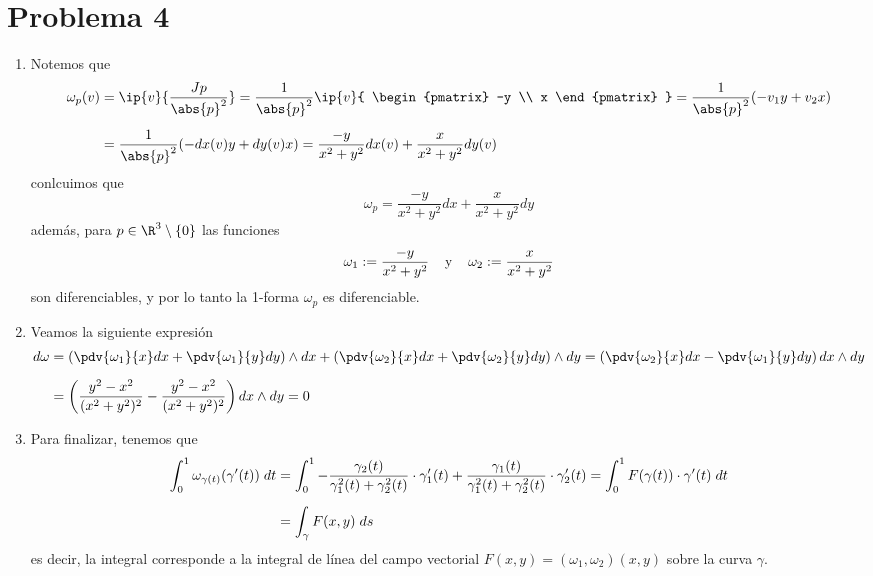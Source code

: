 \documentclass{article}
\begin{document}
\section*{Problema 4}
\begin{enumerate}
    \item Notemos que
    \begin{align*}
        \omega_{p}(v) &= \ip{v}{\frac{Jp}{\abs{p}^{2}}}=\frac{1}{\abs{p}^{2}}\ip{v}{
            \begin{pmatrix}
                -y \\
                x
            \end{pmatrix}
            }=\frac{1}{\abs{p}^{2}}(-v_{1}y+v_{2}x) \\[2mm]
        &= \frac{1}{\abs{p}^{2}}(-dx(v)y+dy(v)x)=\frac{-y}{x^{2}+y^{2}}dx(v)
        +\frac{x}{x^{2}+y^{2}}dy(v)
    \end{align*}
    conlcuimos que
    \begin{equation*}
        \omega_{p}=\frac{-y}{x^{2}+y^{2}}dx+\frac{x}{x^{2}+y^{2}}dy
    \end{equation*}
    además, para $p\in\R^{3}\setminus\{0\}$ las funciones
    \begin{equation*}
        \omega_{1}:=\frac{-y}{x^{2}+y^{2}}\hspace{4mm}\text{y}
        \hspace{4mm}\omega_{2}:=\frac{x}{x^{2}+y^{2}}
    \end{equation*}
    son diferenciables, y por lo tanto la 1-forma $\omega_{p}$ es diferenciable.
    
    \item Veamos la siguiente expresión
    \begin{align*}
        d\omega &= \left(\pdv{\omega_{1}}{x}dx+\pdv{\omega_{1}}{y}dy\right)\land dx
        +\left(\pdv{\omega_{2}}{x}dx+\pdv{\omega_{2}}{y}dy\right)\land dy
        =\left(\pdv{\omega_{2}}{x}dx-\pdv{\omega_{1}}{y}dy\right)dx\land dy \\[2mm]
        &= \left(\frac{y^{2}-x^{2}}{(x^{2}+y^{2})^{2}}
        -\frac{y^{2}-x^{2}}{(x^{2}+y^{2})^{2}}\right)dx\land dy=0
    \end{align*}
    
    \item Para finalizar, tenemos que
    \begin{align*}
        \int_{0}^{1}\omega_{\gamma(t)}(\gamma'(t))\hspace{1mm}dt &= \int_{0}^{1}
        -\frac{\gamma_{2}(t)}{\gamma_{1}^{2}(t)+\gamma_{2}^{2}(t)}\cdot\gamma_{1}'(t)
        +\frac{\gamma_{1}(t)}{\gamma_{1}^{2}(t)+\gamma_{2}^{2}(t)}\cdot\gamma_{2}'(t)
        =\int_{0}^{1}F(\gamma(t))\cdot\gamma'(t)\hspace{1mm}dt \\[2mm]
        &= \int_{\gamma}F(x,y)\hspace{1mm}ds
    \end{align*}
    es decir, la integral corresponde a la integral de línea del campo vectorial 
    $F(x,y)=(\omega_{1},\omega_{2})(x,y)$ sobre la curva $\gamma$.
\end{enumerate}
\end{document}

